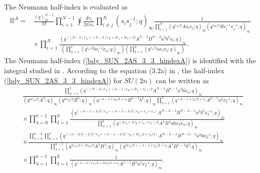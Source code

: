 \documentclass[12pt]{article}
\newcommand{\II}{\mathbb{II}}
\numberwithin{equation}{section}
\begin{document}
The Neumann half-index is evaluated as
\begin{align}
\label{bdy_SUN_2AS_3_3_hindexA}
\II^A = & \frac{(q)_{\infty}^{N-1}}{N!} \prod_{i=1}^{N-1} \oint \frac{ds_i}{2\pi i s_i}
\prod_{i \ne j}^N (s_i s_j^{-1}; q)_{\infty}
\frac{1}{\prod_{i < j}^N  (q^{r_A/2} A s_i s_j; q)_{\infty} (q^{r_B/2} B s_i^{-1} s_j^{-1}; q)_{\infty}}
\nonumber \\
& \times \prod_{i = 1}^N \frac{(q^{((N-2)r_A + (N-2)r_B + 3r_a + 2r_b)/2} A^{N-2} B^{N-2} a^3 b^2 s_i; q)_{\infty}}{\left( \prod_{\alpha = 1}^2 (q^{r_b/2} b s_i^{-1} \tilde{x}_{\alpha}; q)_{\infty} \right) \left( \prod_{I = 1}^3 (q^{r_a/2} a s_i x_I; q)_{\infty} \right)}. 
\end{align}
The Neumann half-index (\ref{bdy_SUN_2AS_3_3_hindexA}) is identified with the integral studied in \cite{MR1266569}. 
According to the equation (3.2a) in \cite{MR1266569}, 
the half-index (\ref{bdy_SUN_2AS_3_3_hindexA}) for $SU(2n)$ can be written as
\begin{align}
\label{bdy_SUN_2AS_3_3_hindexB1}
&
\frac{ \prod_{\alpha = 1}^2 \left( q^{((N-2)r_A + (n-1)r_B + 3r_a + r_b)/2} A^{N-2} B^{n-1} a^3 b \tilde{x}_{\alpha};q \right)_{\infty} }
 {\left( q^{nr_A/2} A^n; q \right)_{\infty} \left( q^{nr_B/2} B^n; q \right)_{\infty} \left( q^{(n-1)r_B/2 + r_b} B^{n-1} b^2; q \right)_{\infty} \prod_{I = 1}^3 (q^{(n-1)r_A/2 + r_a} A^{n-1} a^2 x_I^{-1}; q)_{\infty}}
 \nonumber \\
& \times \prod_{\lambda = 0}^{n-1} \prod_{I = 1}^3 \frac{ \left( q^{((n-1-\lambda/2)r_A + (n-1-\lambda/2)r_B + r_a + r_b)} A^{N-2-\lambda} B^{N-2-\lambda} a^2 b^2 x_I^{-1};q \right)_{\infty} }
 { \prod_{\alpha = 1}^2 \left( q^{(\lambda r_A + \lambda r_B + r_a + r_b)/2} A^{\lambda} B^{\lambda} a b x_I \tilde{x}_{\alpha}; q \right)_{\infty} }
 \nonumber \\
& \times \frac{\prod_{\lambda = 0}^{n-2} \prod_{\alpha = 1}^2 \left( q^{((n-3/2-\lambda/2)r_A + (n-1-\lambda/2)r_B + 3r_a/2 + r_b/2)} A^{N-3-\lambda} B^{N-2-\lambda} a^3 b x_{\alpha}^{-1};q \right)_{\infty} }
 { \prod_{\lambda = 1}^{n-1} \left( q^{\lambda r_A/2 + \lambda r_B/2} A^{\lambda} B^{\lambda}; q \right)_{\infty} \left( q^{\lambda r_A/2 + (\lambda - 1)r_B/2 + r_b} A^{\lambda} B^{\lambda - 1} b^2; q \right)_{\infty} }
 \nonumber \\
& \times \prod_{\lambda = 1}^{n-1} \prod_{I = 1}^3 \frac{1}{\left( q^{(\lambda - 1)r_A/2 + \lambda r_B/2 + r_a} A^{\lambda - 1} B^{\lambda} a^2 x_I^{-1}; q \right)_{\infty}}. 
\end{align}
\end{document}
